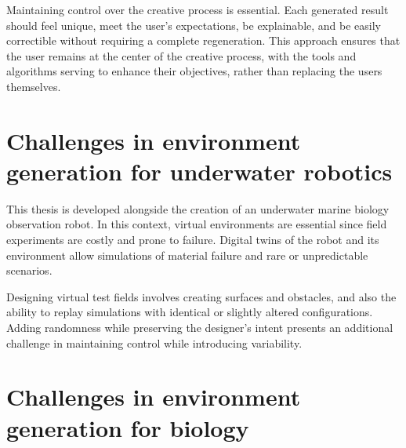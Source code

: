 Maintaining control over the creative process is essential. Each generated result should feel unique, meet the user's expectations, be explainable, and be easily correctible without requiring a complete regeneration. This approach ensures that the user remains at the center of the creative process, with the tools and algorithms serving to enhance their objectives, rather than replacing the users themselves.



\section{Challenges in environment generation for underwater robotics}

This thesis is developed alongside the creation of an underwater marine biology observation robot. In this context, virtual environments are essential since field experiments are costly and prone to failure. Digital twins of the robot and its environment allow simulations of material failure and rare or unpredictable scenarios.


Designing virtual test fields involves creating surfaces and obstacles, and also the ability to replay simulations with identical or slightly altered configurations. Adding randomness while preserving the designer's intent presents an additional challenge in maintaining control while introducing variability.


\section{Challenges in environment generation for biology}

